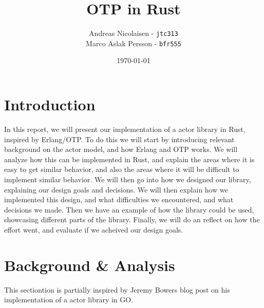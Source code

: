 \documentclass[a4paper]{article}
\title{OTP in Rust}
\author{Andreas Nicolaisen - \texttt{jtc313} \\ Marco Aslak Persson - \texttt{bfr555}}
\date{\today}
\begin{document}

\maketitle

\section{Introduction}
In this report, we will present our implementation of a actor library in Rust,
inspired by Erlang/OTP. To do this we will start by introducing relevant
background on the actor model, and how Erlang and OTP works. We will analyze how
this can be implemented in Rust, and explain the areas where it is easy to get
similar behavior, and also the areas where it will be difficult to implement
similar behavior. We will then go into how we designed our library, explaining
our design goals and decisions. We will then explain how we implemented this
design, and what difficulties we encountered, and what decisions we made. Then
we have an example of how the library could be used, showcasing different parts
of the library. Finally, we will do an reflect on how the effort went, and
evaluate if we acheived our design goals.

\section{Background \& Analysis}
This sectiontion is partially inspired by Jeremy Bowers blog post on his
implementation of a actor library in GO\cite{SuturePost}.


\end{document}
